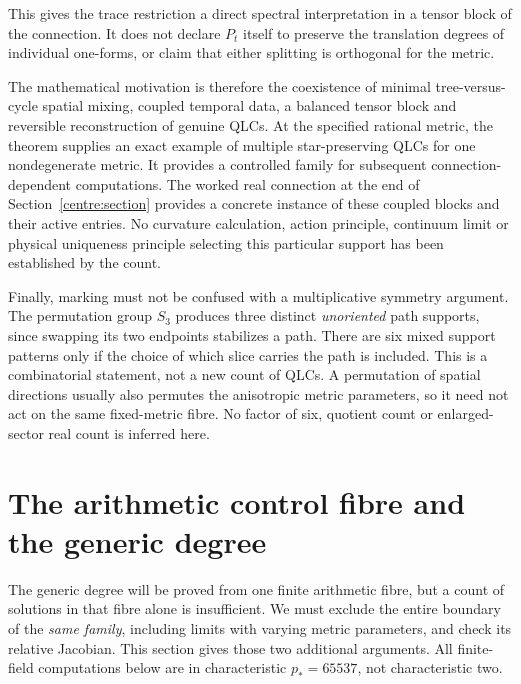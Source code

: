 \documentclass[11pt,a4paper]{article}
\theoremstyle{remark}\newtheorem{remark}[theorem]{Remark}
\begin{document}
This gives the trace restriction a direct spectral interpretation
in a tensor block of the connection. It does not declare $P_t$ itself
to preserve the translation degrees of individual one-forms, or claim
that either splitting is orthogonal for the metric.

The mathematical motivation is therefore the coexistence of minimal
tree-versus-cycle spatial mixing, coupled temporal data, a balanced
tensor block and reversible reconstruction of genuine QLCs. At the
specified rational metric, the theorem supplies an exact example of
multiple star-preserving QLCs for one nondegenerate metric. It provides
a controlled family for subsequent connection-dependent computations.
The worked real connection at the end of Section~\ref{centre:section}
provides a concrete instance of these coupled blocks and their active entries.
No curvature calculation, action principle, continuum limit or
physical uniqueness principle selecting this particular support has
been established by the count.

Finally, marking must not be confused with a multiplicative symmetry
argument. The permutation group $S_3$ produces three distinct
\emph{unoriented} path supports, since swapping its two endpoints
stabilizes a path. There are six mixed support patterns only if the
choice of which slice carries the path is included. This is a
combinatorial statement, not a new count of QLCs. A permutation of
spatial directions usually also permutes the anisotropic metric
parameters, so it need not act on the same fixed-metric fibre. No
factor of six, quotient count or enlarged-sector real count is
inferred here.

\section{The arithmetic control fibre and the generic degree}
\label{generic:section}

The generic degree will be proved from one finite arithmetic fibre, but a
count of solutions in that fibre alone is insufficient. We must exclude
the entire boundary of the \emph{same family}, including limits with
varying metric parameters, and check its relative Jacobian. This section
gives those two additional arguments. All finite-field computations below
are in characteristic $p_*=65537$, not characteristic two.
\end{document}
